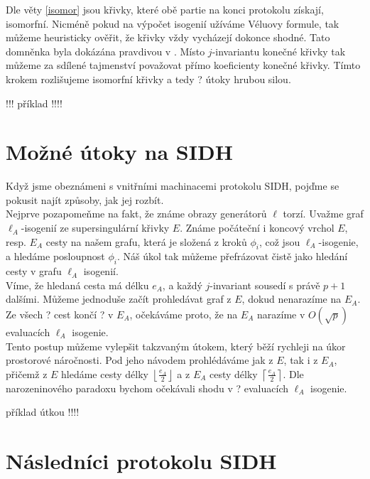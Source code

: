 \documentclass [12pt]{report}
\begin{document}
\begin{poznamka}
Dle věty \ref{isomor} jsou křivky, které obě partie na konci protokolu získají, isomorfní. Nicméně pokud na výpočet isogenií užíváme Véluovy formule, tak můžeme heuristicky ověřit, že křivky vždy vycházejí dokonce shodné. Tato domněnka byla dokázána pravdivou v \cite{Leonardi}. Místo $j$-invariantu konečné křivky tak můžeme za sdílené tajmenství považovat přímo koeficienty konečné křivky. Tímto krokem rozlišujeme isomorfní křivky a tedy ? útoky hrubou silou.
\end{poznamka}

!!! příklad !!!!


\section{Možné útoky na SIDH}

Když jsme obeznámeni s vnitřními machinacemi protokolu SIDH, pojďme se pokusit najít způsoby, jak jej rozbít.\\

Nejprve pozapomeňme na fakt, že známe obrazy generátorů $\ell$ torzí. Uvažme graf $\ell_A$-isogenií ze supersingulární křivky $E$. Známe počáteční i koncový vrchol $E$, resp. $E_A$ cesty na našem grafu, která je složená z kroků $\phi_i$, což jsou $\ell_A$-isogenie, a hledáme posloupnost $\phi_i$. Náš úkol tak můžeme přefrázovat čistě jako hledání cesty v grafu $\ell_A$ isogenií.\\

Víme, že hledaná cesta má délku $e_A$, a každý $j$-invariant sousedí s právě $p+1$ dalšími. Můžeme jednoduše začít prohledávat graf z $E$, dokud nenarazíme na $E_A$. Ze všech ? cest končí ? v $E_A$, očekáváme proto, že na $E_A$ narazíme v $O(\sqrt{p})$ evaluacích $\ell_A$ isogenie.\\

Tento postup můžeme vylepšit takzvaným  útokem, který běží rychleji na úkor prostorové náročnosti. Pod jeho návodem prohlédáváme jak z $E$, tak i z $E_A$, přičemž z $E$ hledáme cesty délky $\left\lfloor \frac{e_A}{2} \right \rfloor$ a z $E_A$ cesty délky $\left\lceil \frac{e_A}{2} \right \rceil$. Dle narozeninového paradoxu bychom očekávali shodu v ? evaluacích $\ell_A$ isogenie.

příklad útkou !!!!

\section{Následníci protokolu SIDH}
\end{document}
